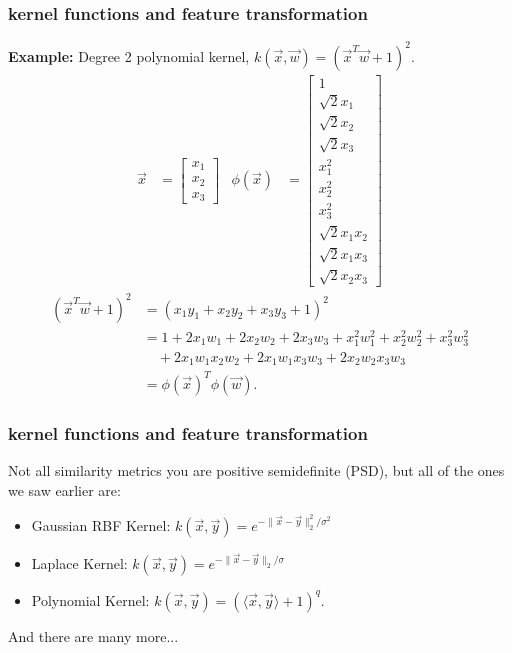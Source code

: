 \documentclass[handout,compress]{beamer}
\begin{document}
\begin{frame} 
	\frametitle{kernel functions and feature transformation}
	\small
	\textbf{Example:} Degree 2 polynomial kernel, $k(\vec{x},\vec{w}) = (\vec{x}^T\vec{w} + 1)^2$.
	\begin{align*}
	\vec{x} &= \begin{bmatrix}x_1\\x_2\\x_3\end{bmatrix} & \phi(\vec{x}) &= \begin{bmatrix}1\\ \sqrt{2}x_1\\\sqrt{2}x_2\\\sqrt{2}x_3 \\ x_1^2 \\ x_2^2 \\ x_3^2 \\ \sqrt{2}x_1x_2 \\ \sqrt{2}x_1x_3 \\ \sqrt{2}x_2x_3\end{bmatrix}  
	\end{align*}
	\begin{align*}
	(\vec{x}^T\vec{w} + 1)^2 &= ({x}_1{y}_1 + {x}_2{y}_2  + {x}_3{y}_3  + 1)^2\\
	&=  1 + 2{x}_1{w}_1 + 2{x}_2{w}_2 + 2{x}_3{w}_3 +  {x}_1^2{w}_1^2 + {x}_2^2{w}_2^2  + {x}_3^2{w}_3^2 \\ & \hspace{1em} + 2{x}_1{w}_1{x}_2{w}_2  +2{x}_1{w}_1{x}_3{w}_3 +2{x}_2{w}_2{x}_3{w}_3\\
	&= \phi(\vec{x})^T\phi(\vec{w}).
	\end{align*}
\end{frame}

\begin{frame} 
	\frametitle{kernel functions and feature transformation}
	Not all similarity metrics you are positive semidefinite (PSD), but all of the ones we saw earlier are:
	\begin{itemize}
		\item Gaussian RBF Kernel: $k(\vec{x}, \vec{y}) = e^{-\|\vec{x} - \vec{y}\|_2^2/\sigma^2}$
		\item Laplace Kernel: $k(\vec{x}, \vec{y}) = e^{-\|\vec{x} - \vec{y}\|_2/\sigma}$
		\item Polynomial Kernel: $k(\vec{x}, \vec{y}) = (\langle \vec{x},\vec{y}\rangle + 1)^q$.
	\end{itemize}
	And there are many more...
\end{frame}
\end{document}

